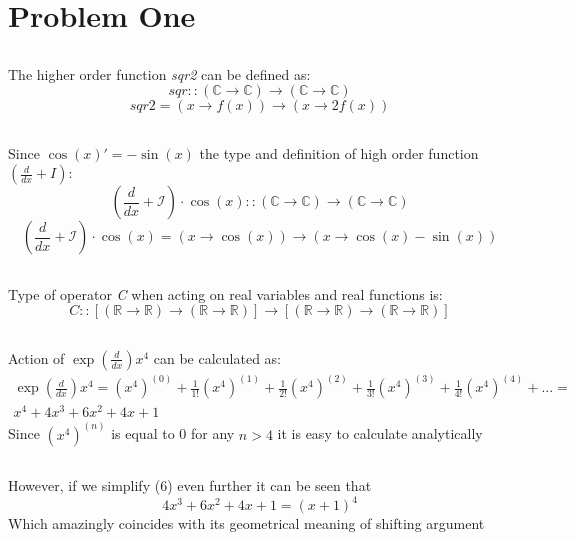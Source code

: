 \documentclass[12pt]{article}
\begin{document}
\renewcommand{\familydefault}{\rmdefault}




\section{Problem One}
\subsection{}
The higher order function \textit{sqr2} can be defined as:
\begin{equation}
    sqr::(\mathbb{C}\rightarrow\mathbb{C}) \rightarrow (\mathbb{C}\rightarrow\mathbb{C})
\end{equation}
\begin{equation}
    sqr2 = (x \rightarrow f(x)) \rightarrow (x \rightarrow 2f(x)) 
\end{equation}

\subsection{}
Since $\cos(x)' = -\sin(x)$ the type and definition of high order function $(\frac{d}{dx} + I)$:
\begin{equation}
    \left(\frac{d}{dx} + \mathcal{I}\right)\cdot\cos(x)::(\mathbb{C}\rightarrow\mathbb{C}) \rightarrow (\mathbb{C}\rightarrow\mathbb{C})
\end{equation}
\begin{equation}
    \left(\frac{d}{dx} + \mathcal{I}\right)\cdot\cos(x) = (x \rightarrow \cos(x)) \rightarrow (x \rightarrow \cos(x) - \sin(x))
\end{equation}

\subsection{}
Type of operator \textit{C} when acting on real variables and real functions is:
\begin{equation}
    C::[(\mathbb{R}\rightarrow\mathbb{R})\rightarrow(\mathbb{R}\rightarrow\mathbb{R})] \rightarrow[(\mathbb{R}\rightarrow\mathbb{R})\rightarrow(\mathbb{R}\rightarrow\mathbb{R})]
\end{equation}

\subsection{}
Action of $\exp\left(\frac{d}{dx}\right)x^4$  can be calculated as:
\begin{multline}
    \exp\left(\frac{d}{dx}\right)x^4 = (x^4)^{(0)} + \frac{1}{1!}(x^4)^{(1)} + \frac{1}{2!}(x^4)^{(2)} + \frac{1}{3!}(x^4)^{(3)} + \frac{1}{4!}(x^4)^{(4)} + ...  =\\x^4 + 4x^3 + 6x^2 + 4x + 1
\end{multline}
Since $(x^4)^{(n)}$ is equal to 0 for any $n>4$ it is easy to calculate analytically
\subsection*{}
However, if we simplify (6) even further it can be seen that
\begin{equation}
    4x^3 + 6x^2 + 4x + 1 = (x+1)^4
\end{equation}
Which amazingly coincides with its geometrical meaning of shifting argument
\end{document}
